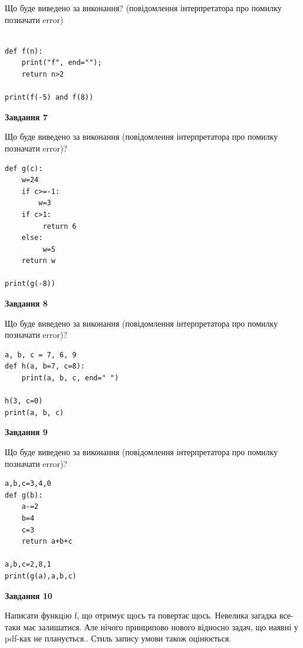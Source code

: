 \documentclass[12pt, ukrainian]{article}
\begin{document}
{\begin {large}
Що буде виведено за виконання? (повідомлення інтерпретатора про помилку позначати error)\par
\begin{verbatim}

def f(n):
    print("f", end="");
    return n>2

print(f(-5) and f(8))
\end{verbatim}

{\begin {center}\textbf{Завдання 7}\end {center}}

Що буде виведено за виконання (повідомлення інтерпретатора про помилку позначати error)?\par
\begin{verbatim}
def g(c):
    w=24
    if c>=-1: 
        w=3
    if c>1:
         return 6
    else:
         w=5
    return w

print(g(-8))
\end{verbatim}

{\begin {center}\textbf{Завдання 8}\end {center}}

Що буде виведено за виконання (повідомлення інтерпретатора про помилку позначати error)?\par
\begin{verbatim}
a, b, c = 7, 6, 9
def h(a, b=7, c=8):
    print(a, b, c, end=" ")

h(3, c=0)
print(a, b, c)
\end{verbatim}

{\begin {center}\textbf{Завдання 9}\end {center}}

Що буде виведено за виконання (повідомлення інтерпретатора про помилку позначати error)?\par
\begin{verbatim}
a,b,c=3,4,0
def g(b):
    a-=2
    b=4
    c=3
    return a+b+c

a,b,c=2,8,1
print(g(a),a,b,c)
\end{verbatim}

{\begin {center}\textbf{Завдання 10}\end {center}}


Написати функцiю f, що отримує щось та повертає щось. Невелика загадка все-таки має залишатися. Але нічого принципово нового відносно задач, що наявні у pdf-ках не планується.. Стиль запису умови також оцінюється.\par
\end {large}}
\newpage
\end{document}
